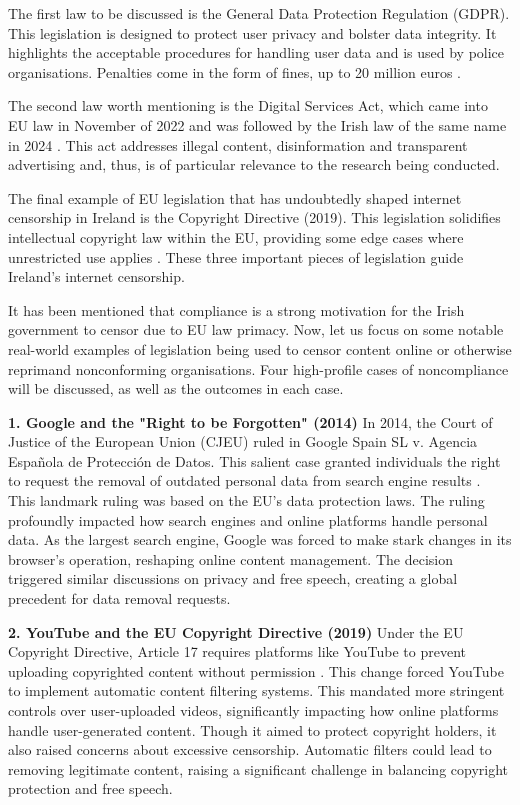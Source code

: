 The first law to be discussed is the General Data Protection Regulation (GDPR). This legislation is designed to protect user privacy and bolster data integrity. It highlights the acceptable procedures for handling user data and is used by police organisations. Penalties come in the form of fines, up to 20 million euros \cite{gdprinfo2025}.

The second law worth mentioning is the Digital Services Act, which came into EU law in November of 2022 and was followed by the Irish law of the same name in 2024 \cite{enterprisegovie2025} \cite{irishstatutebook2024}. This act addresses illegal content, disinformation and transparent advertising and, thus, is of particular relevance to the research being conducted. 

The final example of EU legislation that has undoubtedly shaped internet censorship in Ireland is the Copyright Directive (2019). This legislation solidifies intellectual copyright law within the EU, providing some edge cases where unrestricted use applies \cite{EUCopyright}. These three important pieces of legislation guide Ireland's internet censorship. 

It has been mentioned that compliance is a strong motivation for the Irish government to censor due to EU law primacy. Now, let us focus on some notable real-world examples of legislation being used to censor content online or otherwise reprimand nonconforming organisations. Four high-profile cases of noncompliance will be discussed, as well as the outcomes in each case. 

\textbf{1. Google and the "Right to be Forgotten" (2014)}
In 2014, the Court of Justice of the European Union (CJEU) ruled in Google Spain SL v. Agencia Española de Protección de Datos. This salient case granted individuals the right to request the removal of outdated personal data from search engine results \cite{google2014}. This landmark ruling was based on the EU's data protection laws. The ruling profoundly impacted how search engines and online platforms handle personal data. As the largest search engine, Google was forced to make stark changes in its browser's operation, reshaping online content management. The decision triggered similar discussions on privacy and free speech, creating a global precedent for data removal requests.

\textbf{2. YouTube and the EU Copyright Directive (2019)}
Under the EU Copyright Directive, Article 17 requires platforms like YouTube to prevent uploading copyrighted content without permission \cite{eu2019}. This change forced YouTube to implement automatic content filtering systems. This mandated more stringent controls over user-uploaded videos, significantly impacting how online platforms handle user-generated content. Though it aimed to protect copyright holders, it also raised concerns about excessive censorship. Automatic filters could lead to removing legitimate content, raising a significant challenge in balancing copyright protection and free speech.

